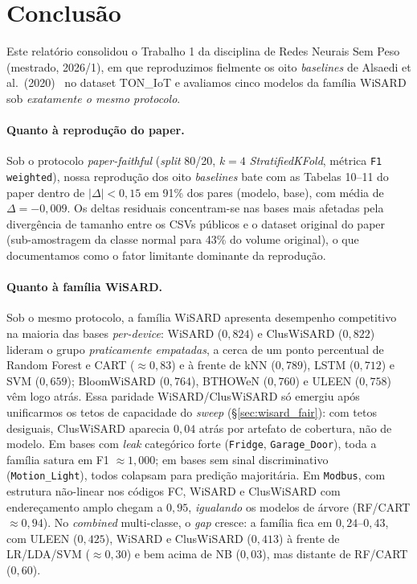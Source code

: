 \section{Conclusão}
\label{sec:conclusao}

Este relatório consolidou o Trabalho 1 da disciplina de Redes
Neurais Sem Peso (mestrado, 2026/1), em que reproduzimos
fielmente os oito \emph{baselines} de Alsaedi et al.\
(2020)~\cite{alsaedi2020toniot} no dataset TON\_IoT e avaliamos cinco
modelos da família WiSARD sob \emph{exatamente o mesmo protocolo}.

\paragraph{Quanto à reprodução do paper.} Sob o protocolo
\emph{paper-faithful} (\emph{split} 80/20, $k=4$ \emph{StratifiedKFold},
métrica \texttt{F1 weighted}), nossa reprodução dos oito
\emph{baselines} bate com as Tabelas 10--11 do paper dentro de
$|\Delta|<0{,}15$ em 91\% dos pares (modelo, base), com média de
$\Delta = -0{,}009$. Os deltas residuais concentram-se nas bases mais
afetadas pela divergência de tamanho entre os CSVs públicos e o
dataset original do paper (sub-amostragem da classe normal para 43\%
do volume original), o que documentamos como o fator limitante
dominante da reprodução.

\paragraph{Quanto à família WiSARD.} Sob o mesmo protocolo, a família
WiSARD apresenta desempenho competitivo na maioria das bases
\emph{per-device}: WiSARD ($0{,}824$) e ClusWiSARD ($0{,}822$) lideram o
grupo \emph{praticamente empatadas}, a cerca de um ponto percentual de
Random Forest e CART ($\approx 0{,}83$) e à frente de kNN ($0{,}789$),
LSTM ($0{,}712$) e SVM ($0{,}659$); BloomWiSARD ($0{,}764$), BTHOWeN
($0{,}760$) e ULEEN ($0{,}758$) vêm logo atrás. Essa paridade
WiSARD/ClusWiSARD só emergiu após unificarmos os tetos de capacidade do
\emph{sweep} (\S{}\ref{sec:wisard_fair}): com tetos desiguais, ClusWiSARD
aparecia $0{,}04$ atrás por artefato de cobertura, não de modelo. Em
bases com \emph{leak} categórico forte (\texttt{Fridge},
\texttt{Garage\_Door}), toda a família satura em F1 $\approx 1{,}000$;
em bases sem sinal discriminativo (\texttt{Motion\_Light}), todos
colapsam para predição majoritária. Em \texttt{Modbus}, com estrutura
não-linear nos códigos FC, WiSARD e ClusWiSARD com endereçamento amplo
chegam a $0{,}95$, \emph{igualando} os modelos de árvore (RF/CART
$\approx 0{,}94$). No \emph{combined} multi-classe, o \emph{gap} cresce:
a família fica em $0{,}24$--$0{,}43$, com ULEEN ($0{,}425$), WiSARD e
ClusWiSARD ($0{,}413$) à frente de LR/LDA/SVM ($\approx 0{,}30$) e bem
acima de NB ($0{,}03$), mas distante de RF/CART ($0{,}60$).

